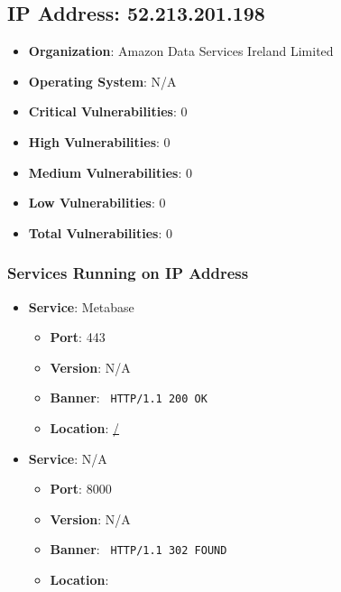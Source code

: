 \documentclass{article}
\begin{document}
\subsection*{IP Address: 52.213.201.198}

\begin{itemize}
    \item \textbf{Organization}: Amazon Data Services Ireland Limited
    \item \textbf{Operating System}:  N/A 
    \item \textbf{Critical Vulnerabilities}: 0
    \item \textbf{High Vulnerabilities}: 0
    \item \textbf{Medium Vulnerabilities}: 0
    \item \textbf{Low Vulnerabilities}: 0
    \item \textbf{Total Vulnerabilities}: 0
\end{itemize}

\subsubsection*{Services Running on IP Address}

\begin{itemize}
    
        \item \textbf{Service}: Metabase
        \begin{itemize}
            \item \textbf{Port}: 443
            \item \textbf{Version}:  N/A 
            \item \textbf{Banner}: \texttt{
                HTTP/1.1 200 OK
            }
            \item \textbf{Location}: \href{ / }{ / }
        \end{itemize}
    
        \item \textbf{Service}: N/A
        \begin{itemize}
            \item \textbf{Port}: 8000
            \item \textbf{Version}:  N/A 
            \item \textbf{Banner}: \texttt{
                HTTP/1.1 302 FOUND
            }
            \item \textbf{Location}: \href{  }{  }
        \end{itemize}
    
\end{itemize}
\end{document}
